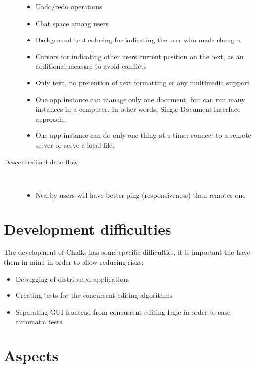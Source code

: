 \documentclass{report}
\begin{document}
\begin{description}
\begin{itemize}
    \item Undo/redo operations
    \item Chat space among users
    \item Background text coloring for indicating the user who made changes
    \item Cursors for indicating other users current position on the text, as an additional measure to avoid conflicts
    \item Only text, no pretention of text formatting or any multimedia support
    \item One app instance can manage only one document, but can run many instances in a computer. In other words, Single Document Interface approach.
    \item One app instance can do only one thing at a time: connect to a remote server or serve a local file.
    \end{itemize}
    
\item [Descentralized data flow] \hspace{0cm} \\
    \begin{itemize}
    \item Nearby users will have better ping (responsiveness) than remotes one
    \end{itemize}
    
\end{description}
\section{Development difficulties}

The development of Chalks has some specific difficulties, it is important the have them in mind in order to allow reducing risks:

\begin{itemize}
\item Debugging of distributed applications
\item Creating tests for the concurrent editing algorithms
\item Separating GUI frontend from concurrent editing logic in order to ease automatic tests
\end{itemize}
\section{Aspects}
\end{document}
